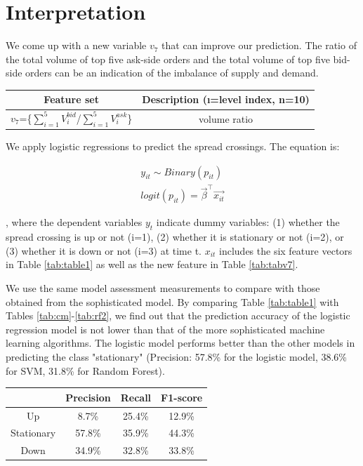 \documentclass[11pt]{article}
\begin{document}
\section{Interpretation} \label{interpretation}
We come up with a new variable $v_{7}$  that can improve our prediction. The ratio of the total volume of top five ask-side orders and the total volume of top five bid-side orders can be an indication of the imbalance of supply and demand.

\begin{center}
   \label{tab:tabv7} 
  \begin{tabular}{|c | c |} 
    \hline
    Feature set & Description (\i=level index, n=10)\\
    \hline
    $v_{7}$=\{$\sum_{i=1}^{5} V_{i}^{bid}$/$\sum_{i=1}^{5} V_{i}^{ask}$\} & volume ratio\\ 
    \hline
  \end{tabular}
\end{center}

We apply logistic regressions to predict the spread crossings. The equation is:

\begin{equation}
	\begin{split}
  y_{it} \sim Binary(p_{it}) \\
  logit(p_{it}) = \vec{\beta}^\top \vec{x_{it}} 
	\end{split}
\end{equation}

, where the dependent variables $y_{t}$ indicate dummy variables: (1) whether the spread crossing is up or not (i=1), (2) whether it is stationary or not (i=2), or (3) whether it is down or not (i=3) at time t. $x_{it}$ includes the six feature vectors in Table \ref{tab:table1} as well as the new feature in Table \ref{tab:tabv7}. 

We use the same model assessment measurements to compare with those obtained from the sophisticated model. By comparing Table \ref{tab:table1} with Tables \ref{tab:cm}-\ref{tab:rf2}, we find out that the prediction accuracy of the logistic regression model is not lower than that of the more sophisticated machine learning algorithms. The logistic model performs better than the other models in predicting the class "stationary" (Precision: 57.8\% for the logistic model, 38.6\% for SVM, 31.8\% for Random Forest).

\begin{center}
   \label{tab:table8} 
  \begin{tabular}{|c | c | c | c|} 
    \hline
     & Precision & Recall & F1-score  \\
    \hline
    Up &  8.7\% & 25.4\% & 12.9\% \\ 
    \hline
    Stationary & 57.8\% & 35.9\% &44.3\% \\
    \hline
    Down & 34.9\% & 32.8\% & 33.8\% \\
    \hline
  \end{tabular}
\end{center}
\end{document}
